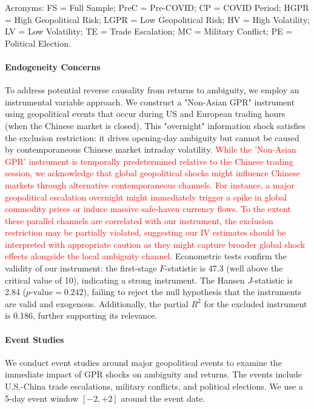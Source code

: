 \documentclass[preprint,12pt,authoryear]{elsarticle}
\begin{document}
\begin{table}[htbp]
\begin{threeparttable}
\begin{tablenotes}[flushleft]
\item[] Acronyms: FS = Full Sample; PreC = Pre-COVID; CP = COVID Period; HGPR = High Geopolitical Risk; LGPR = Low Geopolitical Risk; HV = High Volatility; LV = Low Volatility; TE = Trade Escalation; MC = Military Conflict; PE = Political Election.
\end{tablenotes}
\end{threeparttable}
\end{table}

\paragraph{Endogeneity Concerns} To address potential reverse causality from returns to ambiguity, we employ an instrumental variable approach. We construct a "Non-Asian GPR" instrument using geopolitical events that occur during US and European trading hours (when the Chinese market is closed). This "overnight" information shock satisfies the exclusion restriction: it drives opening-day ambiguity but cannot be caused by contemporaneous Chinese market intraday volatility.  \textcolor{red}{While the 'Non-Asian GPR' instrument is temporally predetermined relative to the Chinese trading session, we acknowledge that global geopolitical shocks might influence Chinese markets through alternative contemporaneous channels. For instance, a major geopolitical escalation overnight might immediately trigger a spike in global commodity prices or induce massive safe-haven currency flows. To the extent these parallel channels are correlated with our instrument, the exclusion restriction may be partially violated, suggesting our IV estimates should be interpreted with appropriate caution as they might capture broader global shock effects alongside the local ambiguity channel.} Econometric tests confirm the validity of our instrument: the first-stage $F$-statistic is 47.3 (well above the critical value of 10), indicating a strong instrument. The Hansen $J$-statistic is 2.84 ($p\text{-value} = 0.242$), failing to reject the null hypothesis that the instruments are valid and exogenous. Additionally, the partial $R^2$ for the excluded instrument is 0.186, further supporting its relevance.

\paragraph{Event Studies} We conduct event studies around major geopolitical events to examine the immediate impact of GPR shocks on ambiguity and returns. The events include U.S.-China trade escalations, military conflicts, and political elections. We use a 5-day event window $[-2, +2]$ around the event date.
\end{document}

